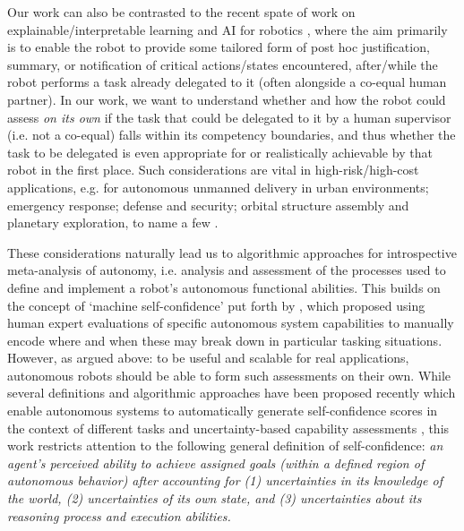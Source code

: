 Our work can also be contrasted to the recent spate of work on explainable/interpretable learning and AI for robotics \cite{...ohgod,somany..}, where the aim primarily is to enable the robot to provide some tailored form of post hoc justification, summary, or notification of critical actions/states encountered, after/while the robot performs a task already delegated to it (often alongside a co-equal human partner). In our work, we want to understand whether and how the robot could assess \emph{on its own} if the task that could be delegated to it by a human supervisor (i.e. not a co-equal) falls within its competency boundaries, and thus whether the task to be delegated is even appropriate for or realistically achievable by that robot in the first place. %
Such considerations are vital in high-risk/high-cost applications, e.g. for autonomous unmanned delivery in urban environments; emergency response; defense and security; orbital structure assembly and planetary exploration, to name a few .   

These considerations naturally lead us to algorithmic approaches for introspective meta-analysis of autonomy, i.e. analysis and assessment of the processes used to define and implement a robot's autonomous functional abilities. This builds on the concept of `machine self-confidence' put forth by \cite{Hutchins2015-if}, which proposed using human expert evaluations of specific autonomous system capabilities to manually encode where and when these may break down in particular tasking situations. However, as argued above: to be useful and scalable for real applications, autonomous robots should be able to form such assessments on their own. While several definitions and algorithmic approaches have been proposed recently which enable autonomous systems to automatically generate self-confidence scores in the context of different tasks and uncertainty-based capability assessments \cite{Sweet2016-tz, Israelsen2019-to},  this work restricts attention to the following general definition of self-confidence: \textit{an agent's perceived ability to achieve assigned goals (within a defined region of autonomous behavior) after accounting for (1) uncertainties in its knowledge of the world, (2) uncertainties of its own state, and (3) uncertainties about its reasoning process and execution abilities.} %

